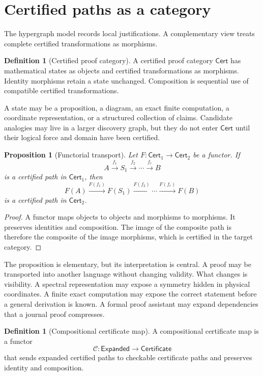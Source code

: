\documentclass[11pt,oneside]{article}
\newtheorem{proposition}[theorem]{Proposition}
\theoremstyle{definition}
\newtheorem{definition}[theorem]{Definition}
\theoremstyle{remark}
\newcommand{\Ccal}{\mathcal C}
\begin{document}
\section{Certified paths as a category}

The hypergraph model records local justifications. A complementary view treats complete certified transformations as morphisms.

\begin{definition}[Certified proof category]
A certified proof category $\mathsf{Cert}$ has mathematical states as objects and certified transformations as morphisms. Identity morphisms retain a state unchanged. Composition is sequential use of compatible certified transformations.
\end{definition}

A state may be a proposition, a diagram, an exact finite computation, a coordinate representation, or a structured collection of claims. Candidate analogies may live in a larger discovery graph, but they do not enter $\mathsf{Cert}$ until their logical force and domain have been certified.

\begin{proposition}[Functorial transport]
Let $F:\mathsf{Cert}_1\to\mathsf{Cert}_2$ be a functor. If
\[
A\xrightarrow{f_1}S_1\xrightarrow{f_2}\cdots\xrightarrow{f_r}B
\]
is a certified path in $\mathsf{Cert}_1$, then
\[
F(A)\xrightarrow{F(f_1)}F(S_1)\xrightarrow{F(f_2)}\cdots\xrightarrow{F(f_r)}F(B)
\]
is a certified path in $\mathsf{Cert}_2$.
\end{proposition}

\begin{proof}
A functor maps objects to objects and morphisms to morphisms. It preserves identities and composition. The image of the composite path is therefore the composite of the image morphisms, which is certified in the target category.
\end{proof}

The proposition is elementary, but its interpretation is central. A proof may be transported into another language without changing validity. What changes is visibility. A spectral representation may expose a symmetry hidden in physical coordinates. A finite exact computation may expose the correct statement before a general derivation is known. A formal proof assistant may expand dependencies that a journal proof compresses.

\begin{definition}[Compositional certificate map]
A compositional certificate map is a functor
\[
\Ccal:\mathsf{Expanded}\longrightarrow\mathsf{Certificate}
\]
that sends expanded certified paths to checkable certificate paths and preserves identity and composition.
\end{definition}
\end{document}
